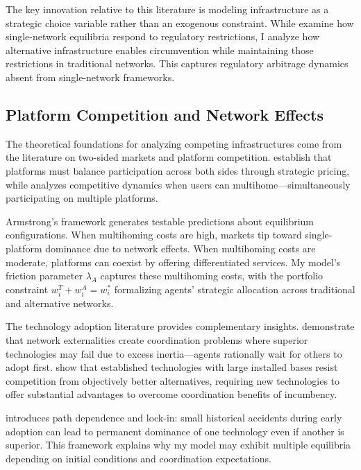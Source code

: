 \documentclass[12pt]{article}
\begin{document}
The key innovation relative to this literature is modeling infrastructure as a strategic choice variable rather than an exogenous constraint. While \citet{jalan_incentive-aware_2024} examine how single-network equilibria respond to regulatory restrictions, I analyze how alternative infrastructure enables circumvention while maintaining those restrictions in traditional networks. This captures regulatory arbitrage dynamics absent from single-network frameworks.

\subsection{Platform Competition and Network Effects}

The theoretical foundations for analyzing competing infrastructures come from the literature on two-sided markets and platform competition. \citet{rochet_platform_2003} establish that platforms must balance participation across both sides through strategic pricing, while \citet{armstrong_competition_2006} analyzes competitive dynamics when users can multihome—simultaneously participating on multiple platforms.

Armstrong's framework generates testable predictions about equilibrium configurations. When multihoming costs are high, markets tip toward single-platform dominance due to network effects. When multihoming costs are moderate, platforms can coexist by offering differentiated services. My model's friction parameter $\lambda_A$ captures these multihoming costs, with the portfolio constraint $w_i^T + w_i^A = w_i^*$ formalizing agents' strategic allocation across traditional and alternative networks.

The technology adoption literature provides complementary insights. \citet{katz_network_1985} demonstrate that network externalities create coordination problems where superior technologies may fail due to excess inertia—agents rationally wait for others to adopt first. \citet{farrell_installed_1986} show that established technologies with large installed bases resist competition from objectively better alternatives, requiring new technologies to offer substantial advantages to overcome coordination benefits of incumbency.

\citet{arthur_competing_1989} introduces path dependence and lock-in: small historical accidents during early adoption can lead to permanent dominance of one technology even if another is superior. This framework explains why my model may exhibit multiple equilibria depending on initial conditions and coordination expectations.
\end{document}

